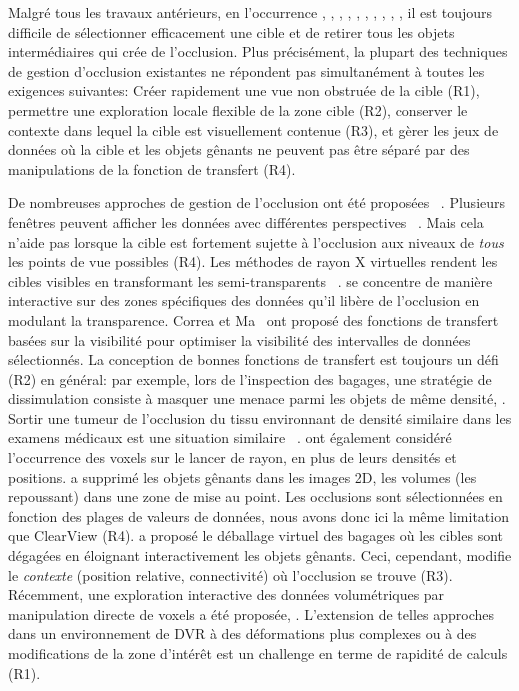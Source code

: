 Malgré tous les travaux antérieurs, en l'occurrence \cite{1250400}, \cite{Sonnet:2004:IEA:989863.989871} ,  \cite{1532818} ,  \cite{4015467}, \cite{Correa:2006:FAV:1187627.1187827},  \cite{Correa:2007:IDD:1313046.1313163}, \cite{5613463}, \cite{Hsu:2011:RFM:2070781.2024165}, \cite{6787171}, \cite{7120994} , il est toujours difficile de sélectionner efficacement une cible et de retirer tous les objets intermédiaires qui crée de l'occlusion. Plus précisément, la plupart des techniques de gestion d'occlusion existantes ne répondent pas simultanément à toutes les exigences suivantes: Créer rapidement une vue non obstruée de la cible (R1), permettre une exploration locale flexible de la zone cible (R2), conserver le contexte dans lequel la cible est visuellement contenue (R3), et gèrer les jeux de données où la cible et les objets gênants ne peuvent pas
être séparé par des manipulations de la fonction de transfert (R4).



De nombreuses approches de gestion de l'occlusion ont été proposées \, \cite{4483791}. Plusieurs fenêtres peuvent afficher les données avec différentes perspectives \, \cite{WangBaldonado:2000:GUM:345513.345271}. Mais cela n'aide pas lorsque la cible est fortement sujette à l'occlusion aux niveaux de \emph{tous} les points de vue possibles (R4). Les méthodes de rayon X virtuelles rendent les cibles visibles en transformant les semi-transparents  \, \cite{Burns:2008:ACC:1457515.1409107}. \cite{4015450} se concentre de manière interactive sur des zones spécifiques des données qu'il libère de l'occlusion en modulant la transparence. Correa et Ma \, \cite{5416704} ont proposé des fonctions de transfert basées sur la visibilité pour optimiser la visibilité des intervalles de données sélectionnés. La conception de bonnes fonctions de transfert est toujours un défi (R2) en général: par exemple, lors de l'inspection des bagages, une stratégie de dissimulation consiste à masquer une menace parmi les objets de même densité, \cite{7819413}. Sortir une tumeur de l'occlusion du tissu environnant de densité similaire dans les examens médicaux est une situation similaire \, \cite{CGF:CGF12927}. \cite{CGF:CGF979} ont également considéré l'occurrence des voxels sur le lancer de rayon, en plus de leurs densités et positions. \cite{6787171} a supprimé les objets gênants dans les images 2D, les volumes (les repoussant) dans une zone de mise au point. Les occlusions sont sélectionnées en fonction des plages de valeurs de données, nous avons donc ici la même limitation que ClearView (R4). \cite{Li:2012:LVV:2425296.2425325} a proposé le déballage virtuel des bagages où les cibles sont dégagées en éloignant interactivement les objets gênants. Ceci, cependant, modifie le \emph{contexte} (position relative, connectivité) où l'occlusion se trouve (R3). Récemment, une exploration interactive des données volumétriques par manipulation directe de voxels a été proposée, \cite{7819413}. L'extension de telles approches dans un environnement de DVR à des déformations plus complexes ou à des modifications de la zone d'intérêt est un challenge en terme de rapidité de calculs (R1).

